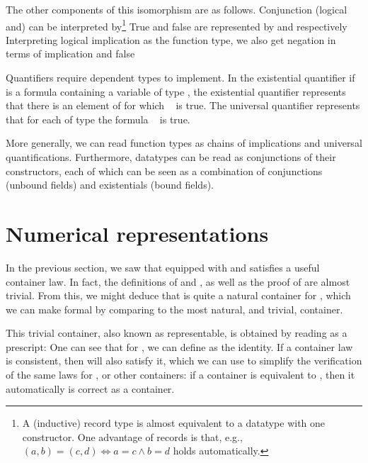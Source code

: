 The other components of this isomorphism are as follows. Conjunction (logical and) can be interpreted by\footnote{A (inductive) record type is almost equivalent to a datatype with one constructor. One advantage of records is that, e.g., $(a, b) = (c , d) \iff a = c \land b = d$ holds automatically.}
True and false are represented by
and respectively
Interpreting logical implication as the function type, we also get negation in terms of implication and false

Quantifiers require dependent types to implement. In the existential quantifier
if  is a formula containing a variable of type , the existential quantifier represents that there is an element  of  for which \  is true. The universal quantifier
represents that for each  of type  the formula \  is true.

More generally, we can read function types as chains of implications and universal quantifications. Furthermore, datatypes can be read as conjunctions of their constructors, each of which can be seen as a combination of conjunctions (unbound fields) and existentials (bound fields). 


\section{Numerical representations}\label{sec:background-numerical}
In the previous section, we saw that  equipped with  and  satisfies a useful container law. In fact, the definitions of  and , as well as the proof of  are almost trivial. From this, we might deduce that  is quite a natural container for \bN{}, which we can make formal by comparing  to the most natural, and trivial, container.

This trivial container, also known as representable, is obtained by reading  as a prescript:
One can see that for , we can define  as the identity. If a container law is consistent, then  will also satisfy it, which we can use to simplify the verification of the same laws for , or other containers: if a container is equivalent to , then it automatically is correct as a container.

